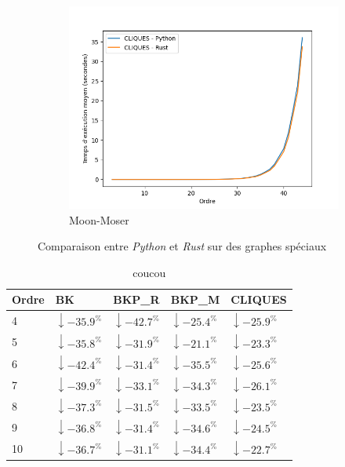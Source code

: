 \documentclass[12pt,a4paper]{article}
\begin{document}
\begin{figure}[h!]
\begin{subfigure}[b]{0.32\textwidth}
    \includegraphics[width=\textwidth]{images/total_CLIQUES_new_pyrust_pivot_turan_plot.png}
  \caption{Moon-Moser}%
  \label{subfig:pr2_cliques_turan}
  \end{subfigure}
  \caption{Comparaison entre \emph{Python} et \emph{Rust} sur des graphes spéciaux}%
  \label{fig:pvr2_all}
\end{figure}
\begin{table}
  \centering
  \begin{tabular}{|l||l|l|l|l|}
    \hline
    Ordre & BK & BKP\_R & BKP\_M & CLIQUES \\
    \hline
    \hline
    4 & $\downarrow-35.9^{\%}$ & $\downarrow-42.7^{\%}$ & $\downarrow-25.4^{\%}$ & $\downarrow-25.9^{\%}$ \\
    5 & $\downarrow-35.8^{\%}$ & $\downarrow-31.9^{\%}$ & $\downarrow-21.1^{\%}$ & $\downarrow-23.3^{\%}$ \\
    6 & $\downarrow-42.4^{\%}$ & $\downarrow-31.4^{\%}$ & $\downarrow-35.5^{\%}$ & $\downarrow-25.6^{\%}$ \\
    7 & $\downarrow-39.9^{\%}$ & $\downarrow-33.1^{\%}$ & $\downarrow-34.3^{\%}$ & $\downarrow-26.1^{\%}$ \\
    8 & $\downarrow-37.3^{\%}$ & $\downarrow-31.5^{\%}$ & $\downarrow-33.5^{\%}$ & $\downarrow-23.5^{\%}$ \\
    9 & $\downarrow-36.8^{\%}$ & $\downarrow-31.4^{\%}$ & $\downarrow-34.6^{\%}$ & $\downarrow-24.5^{\%}$ \\
    10 & $\downarrow-36.7^{\%}$ & $\downarrow-31.1^{\%}$ & $\downarrow-34.4^{\%}$ & $\downarrow-22.7^{\%}$ \\
    \hline
  \end{tabular}
  \caption{coucou}
  \label{table:rust_total}
\end{table}
\end{document}
